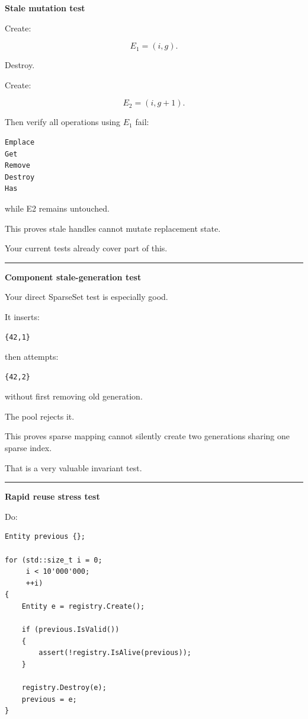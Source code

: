 \textbf{Stale mutation test}

Create:

\[
E_1=(i,g).
\]

Destroy.

Create:

\[
E_2=(i,g+1).
\]

Then verify all operations using \(E_1\) fail:

\begin{verbatim}
Emplace
Get
Remove
Destroy
Has
\end{verbatim}

while E2 remains untouched.

This proves stale handles cannot mutate replacement state.

Your current tests already cover part of this.

\begin{center}\rule{0.5\linewidth}{0.5pt}\end{center}

\textbf{Component stale-generation test}

Your direct SparseSet test is especially good.

It inserts:

\begin{verbatim}
{42,1}
\end{verbatim}

then attempts:

\begin{verbatim}
{42,2}
\end{verbatim}

without first removing old generation.

The pool rejects it.

This proves sparse mapping cannot silently create two generations sharing one sparse index.

That is a very valuable invariant test.

\begin{center}\rule{0.5\linewidth}{0.5pt}\end{center}

\textbf{Rapid reuse stress test}

Do:

\begin{verbatim}
Entity previous {};

for (std::size_t i = 0;
     i < 10'000'000;
     ++i)
{
    Entity e = registry.Create();

    if (previous.IsValid())
    {
        assert(!registry.IsAlive(previous));
    }

    registry.Destroy(e);
    previous = e;
}
\end{verbatim}

